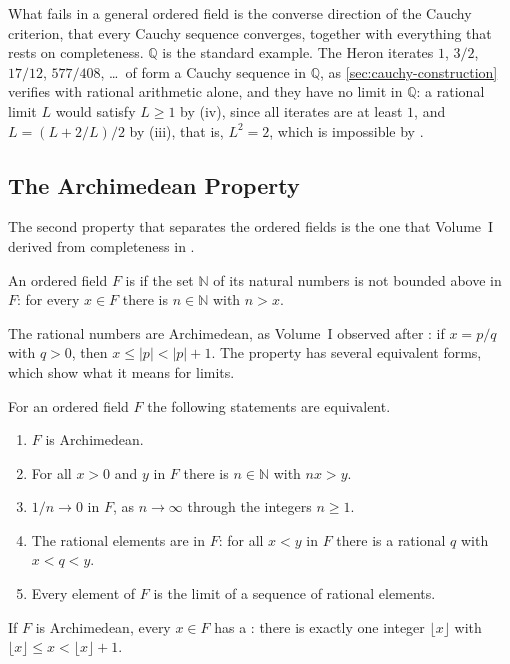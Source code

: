 What fails in a general ordered field is the converse direction of the Cauchy criterion, that every Cauchy sequence converges, together with everything that rests on completeness. $\mathbb Q$ is the standard example. The Heron iterates $1$, $3/2$, $17/12$, $577/408$, \ldots\ of  form a Cauchy sequence in $\mathbb Q$, as \cref{sec:cauchy-construction} verifies with rational arithmetic alone, and they have no limit in $\mathbb Q$: a rational limit $L$ would satisfy $L\ge1$ by (iv), since all iterates are at least $1$, and $L=(L+2/L)/2$ by (iii), that is, $L^2=2$, which is impossible by .

\subsection{The Archimedean Property}

The second property that separates the ordered fields is the one that Volume~I derived from completeness in .

\begin{definition}
\label{def:archimedean}
An ordered field $F$ is  if the set $\mathbb N$ of its natural numbers is not bounded above in $F$: for every $x\in F$ there is $n\in\mathbb N$ with $n>x$.
\end{definition}

The rational numbers are Archimedean, as Volume~I observed after : if $x=p/q$ with $q>0$, then $x\le|p|<|p|+1$. The property has several equivalent forms, which show what it means for limits.

\begin{proposition}
\label{prop:archimedean-forms}
For an ordered field $F$ the following statements are equivalent.
\begin{enumerate}
\item $F$ is Archimedean.
\item For all $x>0$ and $y$ in $F$ there is $n\in\mathbb N$ with $nx>y$.
\item $1/n\to0$ in $F$, as $n\to\infty$ through the integers $n\ge1$.
\item The rational elements are  in $F$: for all $x<y$ in $F$ there is a rational $q$ with $x<q<y$.
\item Every element of $F$ is the limit of a sequence of rational elements.
\end{enumerate}
If $F$ is Archimedean, every $x\in F$ has a : there is exactly one integer $\lfloor x\rfloor$ with $\lfloor x\rfloor\le x<\lfloor x\rfloor+1$.
\end{proposition}

